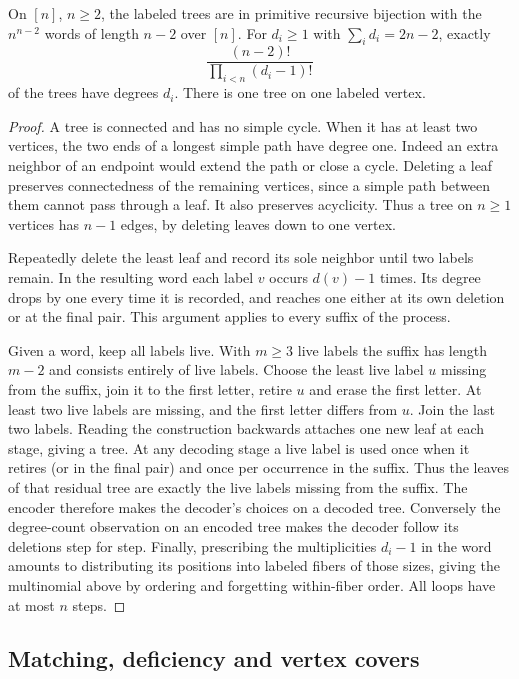 \begin{theorem}\label{result27}\label{thm:graph-prufer}
On $[n]$, $n\ge2$, the labeled trees are in primitive recursive bijection with the $n^{n-2}$ words of length $n-2$ over $[n]$. For $d_i\ge1$ with $\sum_i d_i=2n-2$, exactly
\[
 \frac{(n-2)!}{\prod_{i<n}(d_i-1)!}
\]
of the trees have degrees $d_i$. There is one tree on one labeled vertex.
\end{theorem}
\begin{proof}
A tree is connected and has no simple cycle. When it has at least two vertices, the two ends of a longest simple path have degree one. Indeed an extra neighbor of an endpoint would extend the path or close a cycle. Deleting a leaf preserves connectedness of the remaining vertices, since a simple path between them cannot pass through a leaf. It also preserves acyclicity. Thus a tree on $n\ge1$ vertices has $n-1$ edges, by deleting leaves down to one vertex.

Repeatedly delete the least leaf and record its sole neighbor until two labels remain. In the resulting word each label $v$ occurs $d(v)-1$ times. Its degree drops by one every time it is recorded, and reaches one either at its own deletion or at the final pair. This argument applies to every suffix of the process.

Given a word, keep all labels live. With $m\ge3$ live labels the suffix has length $m-2$ and consists entirely of live labels. Choose the least live label $u$ missing from the suffix, join it to the first letter, retire $u$ and erase the first letter. At least two live labels are missing, and the first letter differs from $u$. Join the last two labels. Reading the construction backwards attaches one new leaf at each stage, giving a tree. At any decoding stage a live label is used once when it retires (or in the final pair) and once per occurrence in the suffix. Thus the leaves of that residual tree are exactly the live labels missing from the suffix. The encoder therefore makes the decoder's choices on a decoded tree. Conversely the degree-count observation on an encoded tree makes the decoder follow its deletions step for step. Finally, prescribing the multiplicities $d_i-1$ in the word amounts to distributing its positions into labeled fibers of those sizes, giving the multinomial above by ordering and forgetting within-fiber order. All loops have at most $n$ steps.
\end{proof}

\subsection{Matching, deficiency and vertex covers}

